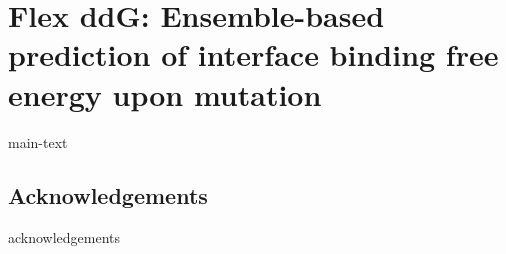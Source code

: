 \chapter{Flex ddG: Ensemble-based prediction of interface binding free energy upon mutation}
\label{chapter:flex-ddG}


{main-text}

\section{Acknowledgements}
{acknowledgements}
